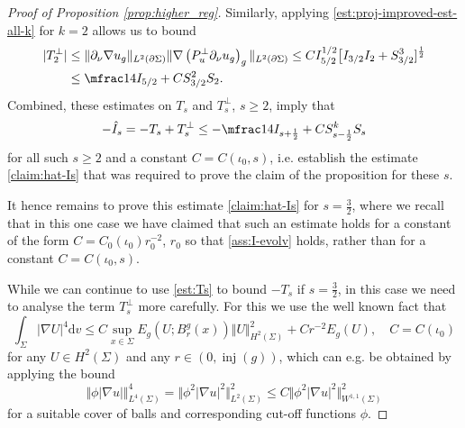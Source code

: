 \documentclass[10pt,reqno]{amsart}
\theoremstyle{plain}
\theoremstyle{definition}
\numberwithin{equation}{section}
\newcommand{\Si}{\Sigma}
\DeclareMathOperator{\inj}{inj}
\newcommand{\norm}[1]{\Vert#1\Vert}
\newcommand{\beq}{\begin{equation}}
\newcommand{\eeq}{\end{equation}}
\newcommand{\beqa}{\begin{equation}\begin{aligned}}
\newcommand{\eeqa}{\end{aligned}\end{equation}}
\newcommand{\half}{\frac{1}{2}}
\newcommand{\dd}{\mathrm{d}} %
\newcommand{\abs}[1]{\vert#1\vert}
\newcommand{\na}{\nabla}
\newcommand{\pSi}{{\partial \Sigma}}
\newcommand{\p}{\partial} %
\begin{document}
\begin{proof}[Proof of Proposition \ref{prop:higher_reg}]
    Similarly, applying \eqref{est:proj-improved-est-all-k} for $k=2$ allows us to bound
    \beqa
        \abs{T_2^\perp}&\leq \norm{\p_\nu\nabla u_g}_{L^2(\pSi)}\norm{\nabla\left(P_u^\perp\p_\nu u_g\right)_g}_{L^2(\pSi)}\leq CI_{5/2}^{1/2} \big[I_{3/2} I_2+S_{3/2}^3]^\half\\
        &\leq \mfrac14 I_{5/2} +C S_{3/2}^2 S_2.
    \eeqa
    Combined, these estimates on $T_s$ and $T_s^\perp$, $s\geq 2$, imply that
    $$-\hat I_s=-T_s+T_s^\perp \leq -\mfrac14 I_{s+\half}+C S_{s-\half}^{k} S_{s}$$
    for all such $s\geq 2$ and a constant $C=C(\iota_0,s)$, i.e. establish the estimate \eqref{claim:hat-Is} that was required to prove the claim of the proposition for these $s$. 

    It hence remains to prove this estimate \eqref{claim:hat-Is} for $s=\frac32$, where we recall that in this one case we have claimed that such an estimate holds for a constant of the form $C=C_0(\iota_0) r_0^{-2}$, $r_0$ so that \eqref{ass:I-evolv} holds, rather than for a constant $C=C(\iota_0,s)$. 

    While we can continue to use  \eqref{est:Ts} to bound $-T_s$ if $s=\frac32$, in this case we need to analyse the term $T_s^\perp$ more carefully. For this we use the well known fact that
    \beq\label{est:L4-improved}
        \int_{\Si}\abs{\na U}^4\dd v \leq C \sup_{x\in \Si} E_g(U;B_r^g(x)) \norm{U}_{H^2(\Si)}^2+Cr^{-2} E_g(U), \quad C=C(\iota_0)
    \eeq
    for any $U\in H^2(\Si)$ and any $r\in (0,\inj(g))$, which can e.g. be obtained by applying the bound 
    $$\norm{\phi \abs{\na u}}_{L^4(\Si)}^4=\norm{\phi^2 \abs{\na u}^2}_{L^2(\Si)}^2\leq C \norm{\phi^2 \abs{\na u}^2}_{W^{1,1}(\Si)}^2$$
    for a suitable cover of balls and corresponding cut-off functions $\phi$. 


\end{proof}
\end{document}

